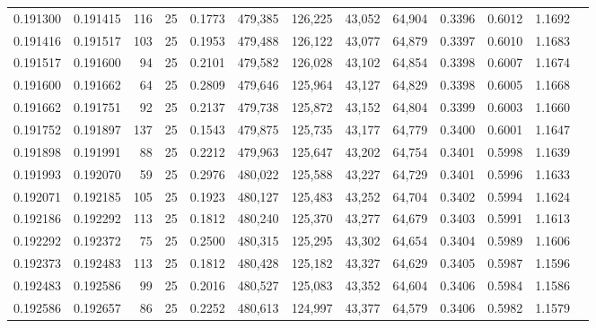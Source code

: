 \begin{tabular}{rrrrrrrrrrrrr}
0.191300 & 0.191415 &   116 &  25 &                                     0.1773 & 479,385 & 126,225 &  43,052 &  64,904 & 0.3396 & 0.6012 & 1.1692 \\
0.191416 & 0.191517 &   103 &  25 &                                     0.1953 & 479,488 & 126,122 &  43,077 &  64,879 & 0.3397 & 0.6010 & 1.1683 \\
0.191517 & 0.191600 &    94 &  25 &                                     0.2101 & 479,582 & 126,028 &  43,102 &  64,854 & 0.3398 & 0.6007 & 1.1674 \\
0.191600 & 0.191662 &    64 &  25 &                                     0.2809 & 479,646 & 125,964 &  43,127 &  64,829 & 0.3398 & 0.6005 & 1.1668 \\
0.191662 & 0.191751 &    92 &  25 &                                     0.2137 & 479,738 & 125,872 &  43,152 &  64,804 & 0.3399 & 0.6003 & 1.1660 \\
0.191752 & 0.191897 &   137 &  25 &                                     0.1543 & 479,875 & 125,735 &  43,177 &  64,779 & 0.3400 & 0.6001 & 1.1647 \\
0.191898 & 0.191991 &    88 &  25 &                                     0.2212 & 479,963 & 125,647 &  43,202 &  64,754 & 0.3401 & 0.5998 & 1.1639 \\
0.191993 & 0.192070 &    59 &  25 &                                     0.2976 & 480,022 & 125,588 &  43,227 &  64,729 & 0.3401 & 0.5996 & 1.1633 \\
0.192071 & 0.192185 &   105 &  25 &                                     0.1923 & 480,127 & 125,483 &  43,252 &  64,704 & 0.3402 & 0.5994 & 1.1624 \\
0.192186 & 0.192292 &   113 &  25 &                                     0.1812 & 480,240 & 125,370 &  43,277 &  64,679 & 0.3403 & 0.5991 & 1.1613 \\
0.192292 & 0.192372 &    75 &  25 &                                     0.2500 & 480,315 & 125,295 &  43,302 &  64,654 & 0.3404 & 0.5989 & 1.1606 \\
0.192373 & 0.192483 &   113 &  25 &                                     0.1812 & 480,428 & 125,182 &  43,327 &  64,629 & 0.3405 & 0.5987 & 1.1596 \\
0.192483 & 0.192586 &    99 &  25 &                                     0.2016 & 480,527 & 125,083 &  43,352 &  64,604 & 0.3406 & 0.5984 & 1.1586 \\
0.192586 & 0.192657 &    86 &  25 &                                     0.2252 & 480,613 & 124,997 &  43,377 &  64,579 & 0.3406 & 0.5982 & 1.1579 \\

\end{tabular}
